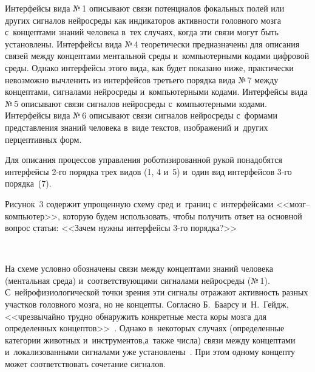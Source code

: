 \begin{multicols}{2}
  Интерфейсы вида №\,1 описывают связи потенциалов фокальных полей или 
других сигналов нейросреды как индикаторов активности головного мозга 
с~концептами знаний человека в~тех случаях, когда эти связи могут быть 
установлены. Интерфейсы вида №\,4 теоретически предназначены для 
описания связей между концептами ментальной среды и~компьютерными 
кодами цифровой среды. Однако интерфейсы этого вида, как будет показано 
ниже, практически невозможно вычленить из интерфейсов третьего порядка 
вида №\,7 между концептами, сигналами нейросреды и~компьютерными 
кодами. Интерфейсы вида №\,5 описывают связи сигналов нейросреды 
с~компьютерными кодами. Интерфейсы вида №\,6 описывают связи сигналов 
нейросреды с~формами представления знаний человека в~виде текстов, 
изображений и~других перцептивных форм.


  Для описания процессов управления роботизированной рукой понадобятся 
интерфейсы 2-го порядка трех видов (1, 4 и~5) и~один вид интерфейсов 3-го 
порядка~(7). 

Рисунок~3 содержит упрощенную схему сред и~границ 
с~интерфейсами <<мозг--ком\-пью\-тер>>, которую будем использовать, чтобы 
получить ответ на основной вопрос статьи: <<Зачем нужны интерфейсы 3-го 
порядка?>>

\begin{figure*} %
\vspace*{1pt}
    \begin{center}  
  \mbox{%
 \epsfxsize=95.147mm 
 }
\end{center}
\vspace*{-9pt}
\end{figure*}
  
  На схеме условно обозначены связи между концептами знаний человека 
(ментальная среда) и~соответствующими сигналами нейросреды (№\,1). 
С~нейрофизиологической точки зрения эти сигналы отражают активность 
разных участков головного мозга, но не концепты. Согласно Б.~Баарсу\linebreak 
и~Н.~Гейдж, <<чрезвычайно трудно обнаружить конкретные места коры мозга 
для определенных концептов>>~\cite{18-zat}. Однако в~некоторых случаях 
(определенные категории животных и~инструментов,\linebreak а~так\-же числа) связи 
между концептами и~локализованными сигналами уже  
установлены~\cite{20-zat, 21-zat}. При этом одному концепту может 
соответствовать сочетание сигналов.
  



\end{multicols}
